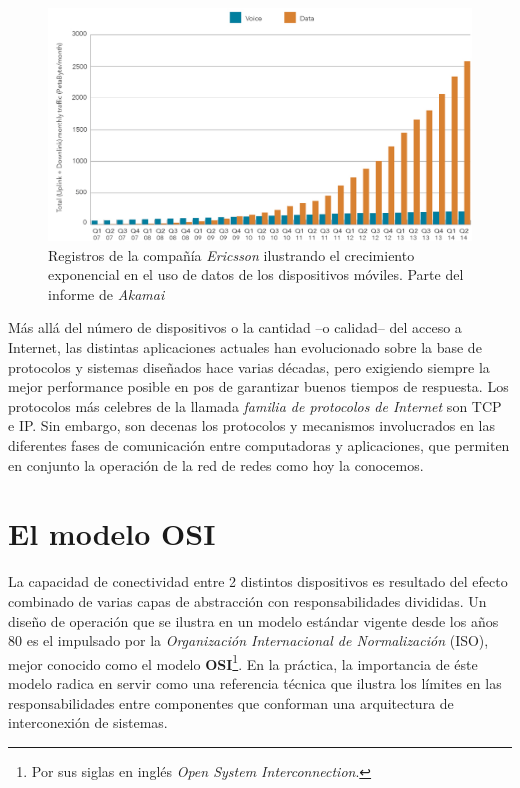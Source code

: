 \begin{figure}[!h]
	\centering
	\includegraphics[scale=0.5]{imagenes/conexiones_moviles}
	\caption{Registros de la compañía \emph{Ericsson} ilustrando el crecimiento exponencial en el uso de datos de los dispositivos móviles. Parte del informe de \emph{Akamai} \cite{report:akamai}}
	\label{fig:akamai_stats}
\end{figure}

Más allá del número de dispositivos o la cantidad --o calidad-- del acceso a Internet, las distintas aplicaciones actuales han evolucionado sobre la base de protocolos y sistemas diseñados hace varias décadas, pero exigiendo siempre la mejor performance posible en pos de garantizar buenos tiempos de respuesta. Los protocolos más celebres de la llamada \emph{familia de protocolos de Internet} son TCP e IP. Sin embargo, son decenas los protocolos y mecanismos involucrados en las diferentes fases de comunicación entre computadoras y aplicaciones, que permiten en conjunto la operación de la red de redes como hoy la conocemos.

\section{El modelo OSI}
La capacidad de conectividad entre 2 distintos dispositivos es resultado del efecto combinado de varias capas de abstracción con responsabilidades divididas. Un diseño de operación que se ilustra en un modelo estándar vigente desde los años 80 es el impulsado por la \emph{Organización Internacional de Normalización} (ISO), mejor conocido como el modelo \textbf{OSI}\footnote{Por sus siglas en inglés \emph{Open System Interconnection}.}. En la práctica, la importancia de éste modelo radica en servir como una referencia técnica que ilustra los límites en las responsabilidades entre componentes que conforman una arquitectura de interconexión de sistemas.

